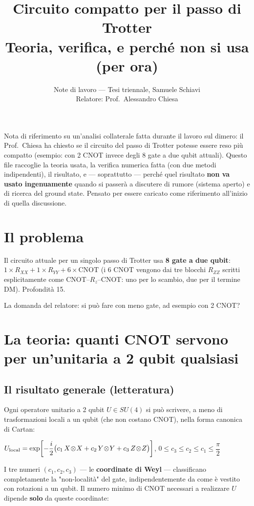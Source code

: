 \documentclass[11pt,a4paper]{article}
\title{\vspace{-1.5em}\color{inkblue}Circuito compatto per il passo di Trotter\\[0.1em]
\Large\normalfont\color{softgray}Teoria, verifica, e perché non si usa (per ora)}
\author{Note di lavoro --- Tesi triennale, Samuele Schiavi\\ Relatore: Prof.\ Alessandro Chiesa}
\date{}
\begin{document}
\sloppy
\maketitle
\thispagestyle{fancy}
\vspace{-2em}

Nota di riferimento su un'analisi collaterale fatta durante il lavoro
sul dimero: il Prof.\ Chiesa ha chiesto se il circuito del passo di
Trotter potesse essere reso più compatto (esempio: con 2 CNOT invece
degli 8 gate a due qubit attuali). Questo file raccoglie la teoria
usata, la verifica numerica fatta (con due metodi indipendenti), il
risultato, e --- soprattutto --- perché quel risultato \textbf{non va
usato ingenuamente} quando si passerà a discutere di rumore (sistema
aperto) e di ricerca del ground state. Pensato per essere caricato come
riferimento all'inizio di quella discussione.

\section{Il problema}

Il circuito attuale per un singolo passo di Trotter usa \textbf{8 gate
a due qubit}: $1\times R_{XX}+1\times R_{YY}+6\times\text{CNOT}$ (i 6
CNOT vengono dai tre blocchi $R_{ZZ}$ scritti esplicitamente come
CNOT--$R_z$--CNOT: uno per lo scambio, due per il termine DM).
Profondità 15.

La domanda del relatore: si può fare con meno gate, ad esempio con 2
CNOT?

\section{La teoria: quanti CNOT servono per un'unitaria a 2 qubit qualsiasi}

\subsection*{Il risultato generale (letteratura)}

Ogni operatore unitario a 2 qubit $U\in SU(4)$ si può scrivere, a meno
di trasformazioni locali a un qubit (che non costano CNOT), nella forma
canonica di Cartan:
\begin{keyeq}
\centering
$U_{\rm local} = \exp\!\left[-\dfrac{i}{2}\big(c_1\,X\!\otimes\!X + c_2\,Y\!\otimes\!Y + c_3\,Z\!\otimes\!Z\big)\right]$,
\quad $0\le c_3\le c_2\le c_1\le\dfrac\pi2$
\end{keyeq}
I tre numeri $(c_1,c_2,c_3)$ --- le \textbf{coordinate di Weyl} ---
classificano completamente la "non-località" del gate,
indipendentemente da come è vestito con rotazioni a un qubit. Il
numero minimo di CNOT necessari a realizzare $U$ dipende \textbf{solo}
da queste coordinate:
\end{document}
